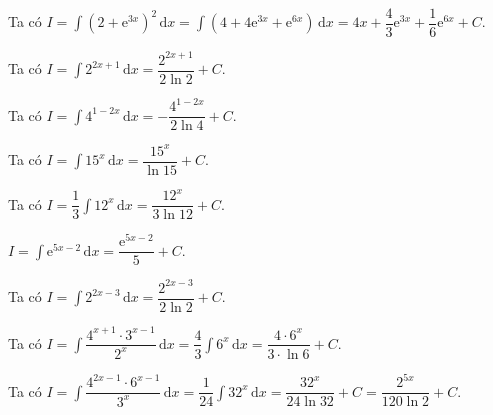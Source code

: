 \begin{vd}
{\begin{listEX}[1]
            \item Ta có $I=\displaystyle\int \left(2+\mathrm{e}^{3x}\right)^2 \mathrm{\,d}x= \displaystyle\int \left(4+4\mathrm{e}^{3x}+ \mathrm{e}^{6x}\right) \mathrm{\,d}x=4x+\dfrac{4}{3}\mathrm{e}^{3x}+\dfrac{1}{6}\mathrm{e}^{6x}+C$.
            \item Ta có $I=\displaystyle\int 2^{2x+1} \mathrm{\,d}x=\dfrac{2^{2x+1}}{2\ln 2}+C$.
            \item Ta có $I=\displaystyle\int 4^{1-2x} \mathrm{\,d}x=-\dfrac{4^{1-2x}}{2\ln 4}+C$.
            \item Ta có $I=\displaystyle\int 15^x \mathrm{\,d}x = \dfrac{15^x}{\ln 15}+C$.
            \item Ta có $I=\dfrac{1}{3}\displaystyle\int 12^x \mathrm{\,d}x=\dfrac{12^x}{3\ln 12}+C$.
            \item $I=\displaystyle\int \mathrm{e}^{5x-2}\mathrm{\,d}x=\dfrac{\mathrm{e}^{5x-2}}{5}+C$.
            \item Ta có $I=\displaystyle\int 2^{2x-3} \mathrm{\,d}x =\dfrac{ 2^{2x-3}}{2\ln 2}+C$.
            \item Ta có $I=\displaystyle\int \dfrac{4^{x+1} \cdot 3^{x-1}}{2^x} \mathrm{\,d}x=\dfrac{4}{3}\displaystyle\int 6^x\mathrm{\,d}x= \dfrac{4\cdot 6^x}{3\cdot \ln 6}+C$.
            \item Ta có $I=\displaystyle\int \dfrac{4^{2x-1} \cdot 6^{x-1}}{3^x} \mathrm{\,d}x=\dfrac{1}{24}\displaystyle\int 32^x \mathrm{\,d}x=\dfrac{32^x}{24\ln 32}+C=\dfrac{2^{5x}}{120\ln 2}+C$.
        \end{listEX}
    }
\end{vd}
